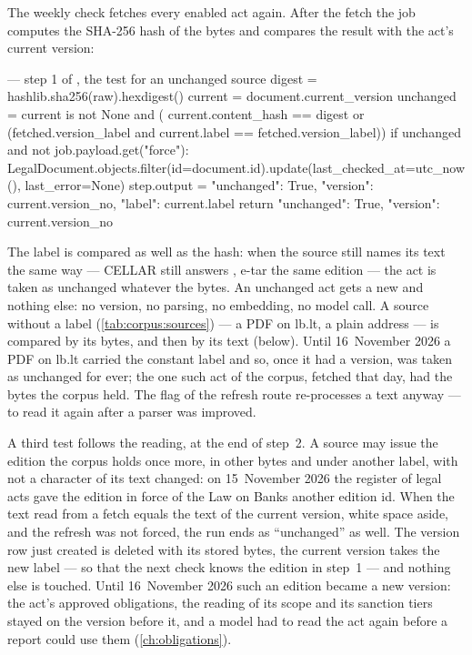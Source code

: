 The weekly check fetches every enabled act again. After the fetch the job computes the SHA-256
hash of the bytes and compares the result with the act's current version:

\begin{codefile}{ --- step 1 of , the test for an unchanged source}
digest = hashlib.sha256(raw).hexdigest()
current = document.current_version
unchanged = current is not None and (
    current.content_hash == digest or (fetched.version_label and current.label == fetched.version_label))
if unchanged and not job.payload.get("force"):
    LegalDocument.objects.filter(id=document.id).update(last_checked_at=utc_now(), last_error=None)
    step.output = {"unchanged": True, "version": current.version_no, "label": current.label}
    return {"unchanged": True, "version": current.version_no}
\end{codefile}

The label is compared as well as the hash: when the source still names its text the same way
--- CELLAR still answers , e-tar the same edition --- the act is
taken as unchanged whatever the bytes. An unchanged act gets a new
 and nothing else: no version, no parsing, no embedding, no model call.
A source without a label (\cref{tab:corpus:sources}) --- a PDF on lb.lt, a plain address ---
is compared by its bytes, and then by its text (below). Until 16~November 2026 a PDF on lb.lt
carried the constant label  and so, once it had a version, was taken as unchanged
for ever; the one such act of the corpus, fetched that day, had the bytes the corpus held.
The  flag of the refresh route re-processes a text anyway --- to read it again
after a parser was improved.

A third test follows the reading, at the end of step~2. A source may issue the edition the
corpus holds once more, in other bytes and under another label, with not a character of its
text changed: on 15~November 2026 the register of legal acts gave the edition in force of the
Law on Banks another edition id. When the text read from a fetch equals the text of the
current version, white space aside, and the refresh was not forced, the run ends as
\enquote{unchanged} as well. The version row just created is deleted with its stored bytes,
the current version takes the new label --- so that the next check knows the edition in
step~1 --- and nothing else is touched. Until 16~November 2026 such an edition became a new
version: the act's approved obligations, the reading of its scope and its sanction tiers
stayed on the version before it, and a model had to read the act again before a report could
use them (\cref{ch:obligations}).

